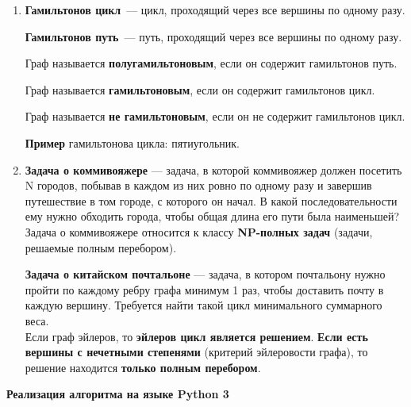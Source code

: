\documentclass[a4paper,12pt]{article}
\theoremstyle{plain} %
\theoremstyle{definition} %
\theoremstyle{remark} %
\newcounter{num}
\begin{document}
\begin{enumerate}
\item \textbf{Гамильтонов цикл}~--- цикл, проходящий через все вершины по одному разу.

\textbf{Гамильтонов путь}~--- путь, проходящий через все вершины по одному разу.

Граф называется \textbf{полугамильтоновым}, если он содержит гамильтонов путь.

Граф называется \textbf{гамильтоновым}, если он содержит гамильтонов цикл.

Граф называется \textbf{не гамильтоновым}, если он не содержит гамильтонов цикл.

\textbf{Пример} гамильтонова цикла: пятиугольник.

\item \textbf{Задача о коммивояжере} --- задача, в которой коммивояжер должен посетить N городов, побывав в каждом из них ровно по одному разу и завершив путешествие в том городе, с которого он начал. В какой последовательности ему нужно обходить города, чтобы общая длина его пути была наименьшей?\\
Задача о коммивояжере относится к классу \textbf{NP-полных задач} (задачи, решаемые полным перебором).

\textbf{Задача о китайском почтальоне} --- задача, в котором почтальону нужно пройти по каждому ребру графа минимум 1 раз, чтобы доставить почту в каждую вершину. Требуется найти такой цикл минимального суммарного веса. \\
Если граф эйлеров, то \textbf{эйлеров цикл является решением}. \textbf{Если есть вершины с нечетными степенями} (критерий эйлеровости графа), то решение находится \textbf{только полным перебором}.
\end{enumerate}

\newpage
\begin{center}
\textbf{Реализация алгоритма на языке Python 3}
\end{center}
\end{document}
